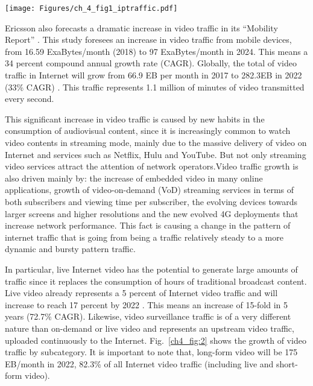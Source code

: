 \begin{center}
\texttt{[image: Figures/ch\_4\_fig1\_iptraffic.pdf]}
\label{ch4_fig:1}       %
\end{center}



Ericsson also forecasts a dramatic increase in video traffic in its “Mobility Report” \cite{ericsson2017}. This study foresees an increase in video traffic from mobile devices, from 16.59 ExaBytes/month (2018) to 97 ExaBytes/month in 2024. This means a 34 percent compound annual growth rate (CAGR). Globally, the total of video traffic in Internet will grow from 66.9 EB per month in 2017 to 282.3EB in 2022 (33\% CAGR) \cite{Cisco_2019}. This traffic represents 1.1 million of minutes of video transmitted every second.

This significant increase in video traffic is caused by new habits in the consumption of audiovisual content, since it is increasingly common to watch video contents in streaming mode, mainly due to the massive delivery of video on Internet and services such as Netflix, Hulu and YouTube. But not only streaming video services attract the attention of network operators.Video traffic growth is also driven mainly by: the increase of embedded video in many online applications, growth of video-on-demand (VoD) streaming services in terms of both subscribers and viewing time per subscriber, the evolving devices towards larger screens and higher resolutions and the new evolved 4G deployments that increase network performance. This fact is causing a change in the pattern of internet traffic that is going from being a traffic relatively steady to a more dynamic and bursty pattern traffic.

In particular, live Internet video has the potential to generate large amounts of traffic since it replaces the consumption of hours of traditional broadcast content. Live video already represents a 5 percent of Internet video traffic and will increase to reach 17 percent by 2022 \cite{Cisco_2019}. This means an increase of 15-fold in 5 years (72.7\% CAGR). Likewise, video surveillance traffic is of a very different nature than on-demand or live video and represents an upstream video traffic, uploaded continuously to the Internet. Fig.~\ref{ch4_fig:2} shows the growth of video traffic by subcategory. It is important to note that, long-form video will be 175 EB/month in 2022, 82.3\% of all Internet video traffic (including live and short-form video).


